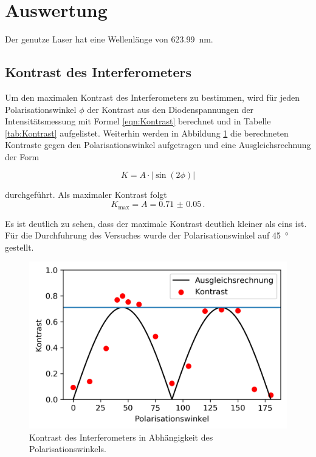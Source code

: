 \section{Auswertung}
Der genutze Laser hat eine Wellenlänge von \SI{623.99}{\nano\meter}.

\subsection{Kontrast des Interferometers}
Um den maximalen Kontrast des Interferometers zu bestimmen, wird für jeden Polarisationswinkel $\phi$  der Kontrast aus den Diodenspannungen der Intensitätsmessung mit Formel \ref{eqn:Kontrast} berechnet und in Tabelle \ref{tab:Kontrast} aufgelistet.
Weiterhin werden in Abbildung \ref{fig:Kontrast} die berechneten Kontraste gegen den Polarisationswinkel aufgetragen und eine Ausgleichsrechnung der Form

\begin{equation*}
  K = A \cdot |\sin(2 \phi)|
\end{equation*}

durchgeführt. Als maximaler Kontrast folgt
\begin{equation}
  K_\text{max} = A = \num{0.71(5)} \, .
  \label{eqn:Kontrast}
\end{equation}

Es ist deutlich zu sehen, dass der maximale Kontrast deutlich kleiner als eins ist. Für die Durchfuhrung des Versuches wurde der Polarisationswinkel auf \SI{45}{\degree} gestellt.

\begin{figure}[H]
  \centering
  \includegraphics[width = .5\textwidth]{Auswertung/Plots/Kontrast.png}
  \caption{Kontrast des Interferometers in Abhängigkeit des Polarisationswinkels. }
  \label{fig:Kontrast}
\end{figure}

